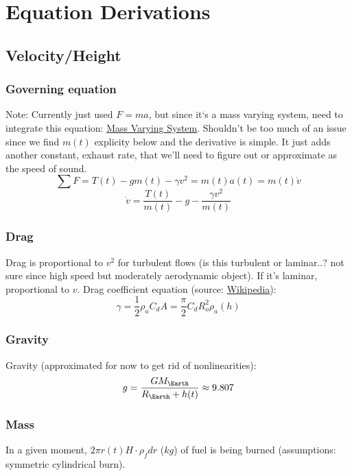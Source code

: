 \documentclass[12pt,a4paper]{article}
\begin{document}
\section{Equation Derivations}
\subsection{Velocity/Height}
\subsubsection{Governing equation}
Note: Currently just used $F=ma$, but since it‘s a mass varying system, need to integrate this equation: \hyperlink{’https://en.wikipedia.org/wiki/Variable-mass_system}{Mass Varying System}. Shouldn’t be too much of an issue since we find $m(t)$ explicity below and the derivative is simple. It just adds another constant, exhaust rate, that we’ll need to figure out or approximate as the speed of sound.
$$\sum F = T(t) - gm(t) - \gamma v^2 = m(t)a(t) = m(t)\dot{v}$$
\begin{equation}
\dot{v} = \frac{T(t)}{m(t)} - g - \frac{\gamma v^2}{m(t)}
\label{eq:main}
\end{equation}

\subsubsection{Drag}
Drag is proportional to $v^2$ for turbulent flows (is this turbulent or laminar..? not sure since high speed but moderately aerodynamic object). If it’s laminar, proportional to $v$.
Drag coefficient equation (source: \href{https://en.wikipedia.org/wiki/Drag_(physics)#Types_of_drag}{Wikipedia}):
\begin{equation}
\gamma = \frac{1}{2}\rho_a C_d A = \frac{\pi}{2} C_d R_o^2\rho_a(h)
\label{eq:gamma}
\end{equation}

\subsubsection{Gravity}
Gravity (approximated for now to get rid of nonlinearities):
$$g=\frac{GM_{\Earth}}{R_{\Earth} + h(t)} \approx 9.807$$

\subsubsection{Mass}
In a given moment, $2\pi r(t) H \cdot \rho_f dr$ ($kg$) of fuel is being burned (assumptions: symmetric cylindrical burn). 
\end{document}
